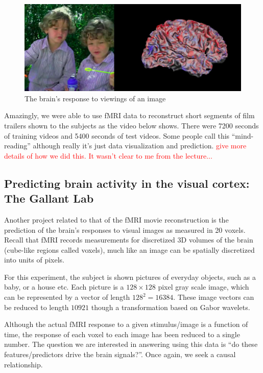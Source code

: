 \begin{figure}[H]
\begin{center}
\includegraphics[scale=0.2]{brain.png}
\end{center}
\caption{The brain's response to viewings of an image}
\label{fig:fmri}
\end{figure}


Amazingly, we were able to use fMRI data to reconstruct short segments of film trailers shown to the subjects as the video below shows. There were 7200 seconds of training videos and 5400 seconds of test videos. Some people call this ``mind-reading'' although really it's just data visualization and prediction. \textcolor{red}{give more details of how we did this. It wasn't clear to me from the lecture...}


\subsection*{Predicting brain activity in the visual cortex: The Gallant Lab}

Another project related to that of the fMRI movie reconstruction is the prediction of the brain's responses to visual images as measured in 20 voxels. Recall that fMRI records measurements for discretized 3D volumes of the brain (cube-like regions called voxels), much like an image can be spatially discretized into units of pixels.

For this experiment, the subject is shown pictures of everyday objects, such as a baby, or a house etc. Each picture is a $128 \times 128$ pixel gray scale image, which can be represented by a vector of length $128^2 = 16384$. These image vectors can be reduced to length $10921$ though a transformation based on Gabor wavelets.

Although the actual fMRI response to a given stimulus/image is a function of time, the response of each voxel to each image has been reduced to a single number. The question we are interested in answering using this data is ``do these features/predictors drive the brain signals?''. Once again, we seek a causal relationship.


